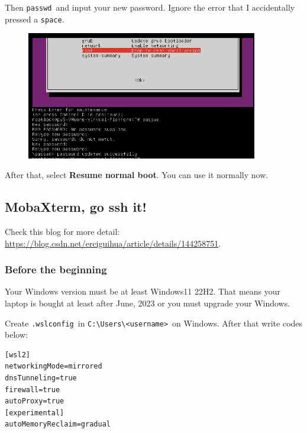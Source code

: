 \documentclass[12pt]{ctexart}
\newenvironment{mdquote}
{%
  \par\noindent
  \begin{list}{}{%
      \setlength{\leftmargin}{1em}%
      \setlength{\rightmargin}{0pt}%
      \setlength{\itemindent}{0pt}%
      \setlength{\listparindent}{\parindent}%
      \setlength{\topsep}{0.5\baselineskip}%
  }
  \item[\textbf{>}\ ]\itshape
}
{\end{list}\par}
\begin{document}
Then \texttt{passwd}\ and input your new password. Ignore the error that
I accidentally pressed a \texttt{space}.

\begin{figure}[H]
    \centering
    \includegraphics[width=0.9\textwidth,keepaspectratio]{assets/Linux/2.1 SHIT, I forgot my password again!/6.png}
\end{figure}

After that, select \textbf{Resume normal boot}. You can use it normally
now.

\newpage
\subsection{\textbf{MobaXterm, go ssh it!}}

\begin{mdquote}
Check this blog for more detail:
\url{https://blog.csdn.net/erciguihua/article/details/144258751}.
\end{mdquote}

\subsubsection{\textbf{Before the beginning}}

\begin{mdquote}
Your Windows version must be at least Windows11 22H2. That means your
laptop is bought at least after June, 2023 or you must upgrade your
Windows.
\end{mdquote}

Create \texttt{.wslconfig}\ in
\texttt{C:\textbackslash{}Users\textbackslash{}\textless{}username\textgreater{}}\
on Windows. After that write codes below:

\begin{adjustwidth}{2em}{0pt}
\begin{verbatim}
[wsl2]
networkingMode=mirrored
dnsTunneling=true
firewall=true
autoProxy=true
[experimental]
autoMemoryReclaim=gradual
\end{verbatim}
\end{adjustwidth}
\end{document}
